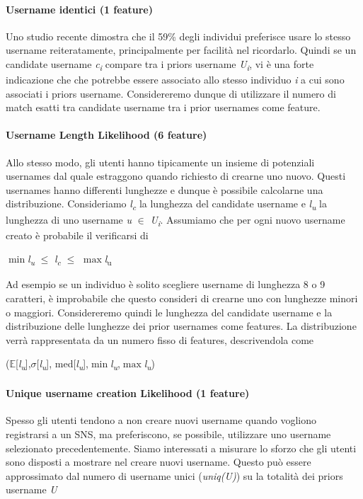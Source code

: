 \paragraph{Username identici (1 feature)}
Uno studio recente\cite{zafarani09} dimostra che il 59\% degli individui preferisce usare lo stesso username reiteratamente, principalmente per facilità nel ricordarlo. Quindi se un candidate username \textit{c\textsubscript{i}} compare tra i priors username \textit{U\textsubscript{i}}, vi è una forte indicazione che che potrebbe essere associato allo stesso individuo \textit{i} a cui sono associati i priors username. Considereremo dunque di utilizzare il numero di match esatti tra candidate username tra i prior usernames come feature.

\paragraph{Username Length Likelihood (6 feature)}
Allo stesso modo, gli utenti hanno tipicamente un insieme di potenziali usernames dal quale estraggono quando richiesto di crearne uno nuovo. Questi usernames hanno differenti lunghezze e dunque è possibile calcolarne una distribuzione. Consideriamo \textit{l\textsubscript{c}} la lunghezza del candidate username e \textit{l\textsubscript{u}} la lunghezza di uno username \textit{u} $\in$ \textit{U\textsubscript{i}}.
Assumiamo che per ogni nuovo username creato è probabile il verificarsi di\\
\centerline{$\min$\textit{l\textsubscript{u}} $\leq$ \textit{l\textsubscript{c}} $\leq$ $\max$\textit{l}\textsubscript{u}}
Ad esempio se un individuo è solito scegliere username di lunghezza 8 o 9 caratteri, è improbabile che questo consideri di crearne uno con lunghezze minori o maggiori.
Considereremo quindi le lunghezza del candidate username e la distribuzione delle lunghezze dei prior usernames come features. La distribuzione verrà rappresentata da un numero fisso di features, descrivendola come\\
\centerline{($\mathbb{E}$[\textit{l\textsubscript{u}}],$\sigma$[\textit{l\textsubscript{u}}], med[\textit{l\textsubscript{u}}],$\min$\textit{l\textsubscript{u}},$\max$\textit{l\textsubscript{u}})}

\paragraph{Unique username creation Likelihood (1 feature)}
Spesso gli utenti tendono a non creare nuovi username quando vogliono registrarsi a un SNS, ma preferiscono, se possibile, utilizzare uno username selezionato precedentemente. Siamo interessati a misurare lo sforzo che gli utenti sono disposti a mostrare nel creare nuovi username. Questo può essere approssimato dal numero di username unici (\textit{uniq(U)}) su la totalità dei priors username \textit{U}

